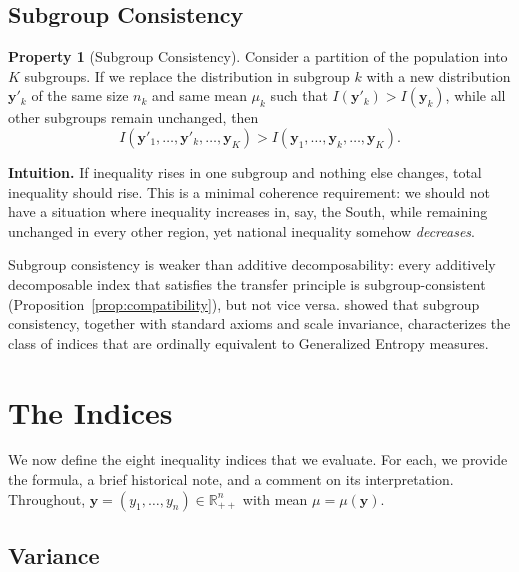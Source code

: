 \documentclass[12pt]{article}
\theoremstyle{plain}
\theoremstyle{definition}
\newtheorem{axiom}{Property}
\theoremstyle{remark}
\newcommand{\R}{\mathbb{R}}
\newcommand{\bfy}{\mathbf{y}}
\begin{document}
\subsection{Subgroup Consistency}\label{sec:subgroup}

\begin{axiom}[Subgroup Consistency]\label{ax:subgroup}
Consider a partition of the population into $K$ subgroups.
If we replace the distribution in subgroup $k$ with a new distribution $\bfy'_k$ of the same size $n_k$ and same mean $\mu_k$ such that $I(\bfy'_k) > I(\bfy_k)$, while all other subgroups remain unchanged, then
\begin{equation}
I(\bfy'_1, \ldots, \bfy'_k, \ldots, \bfy_K) > I(\bfy_1, \ldots, \bfy_k, \ldots, \bfy_K).
\end{equation}
\end{axiom}

\textbf{Intuition.}
If inequality rises in one subgroup and nothing else changes, total inequality should rise.
This is a minimal coherence requirement: we should not have a situation where inequality increases in, say, the South, while remaining unchanged in every other region, yet national inequality somehow \emph{decreases}.

Subgroup consistency is weaker than additive decomposability: every additively decomposable index that satisfies the transfer principle is subgroup-consistent (Proposition~\ref{prop:compatibility}), but not vice versa.
\citet{Shorrocks1988} showed that subgroup consistency, together with standard axioms and scale invariance, characterizes the class of indices that are ordinally equivalent to Generalized Entropy measures.

\section{The Indices}\label{sec:indices}

We now define the eight inequality indices that we evaluate.
For each, we provide the formula, a brief historical note, and a comment on its interpretation.
Throughout, $\bfy = (y_1, \ldots, y_n) \in \R_{++}^n$ with mean $\mu = \mu(\bfy)$.

\subsection{Variance}\label{sec:var}
\end{document}
